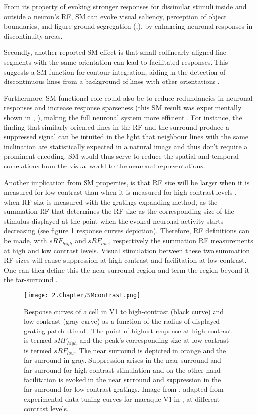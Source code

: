 From its property of evoking stronger responses for dissimilar stimuli inside and outside a neuron's RF, SM can evoke visual saliency, perception of object boundaries, and figure-ground segregation (\cite{Nothdurft2000},\cite{Lamme1995}), by enhancing neuronal responses in discontinuity areas.

Secondly, another reported SM effect is that small collinearly aligned line segments with the same orientation can lead to facilitated responses. This suggests a SM function for contour integration, aiding in the detection of discontinuous lines from a background of lines with other orientations \cite{Kapadia1995}.

Furthermore, SM functional role could also be to reduce redundancies in neuronal responses and increase response sparseness (this SM result was experimentally shown in \cite{Vinje2000}, \cite{Wolf2014}), making the full neuronal system more efficient \cite{Barlow1961}. For instance, the finding that similarly oriented lines in the RF and the surround produce a suppressed signal can be intuited in the light that neighbour lines with the same inclination are statistically expected in a natural image and thus don't require a prominent encoding. SM would thus serve to reduce the spatial and temporal correlations from the visual world to the neuronal representations.

Another implication from SM properties, is that RF size will be larger when it is measured for low contrast than when it is measured for high contrast levels  \cite{Sceniak1999}, when RF size is measured with the gratings expanding method, as the summation RF that determines the RF size as the corresponding size of the stimulus displayed at the point when the evoked neuronal activity starts decreasing (see figure \ref{SMcontrast} response curves depiction). Therefore, RF definitions can be made, with $sRF_{high}$ and $sRF_{low}$, respectively the summation RF measurements at high and low contrast levels. Visual stimulation between these two summation RF sizes will cause suppression at high contrast and facilitation at low contrast. One can then define this the near-surround region and term the region beyond it the far-surround \cite{Angelucci2017}.

\begin{figure}[H]
\center
\texttt{[image: 2.Chapter/SMcontrast.png]}
\caption{Response curves of a cell in V1 to high-contrast (black curve) and low-contrast (gray curve) as a function of the radius of displayed grating patch stimuli. The point of highest response at high-contrast is termed $sRF_{high}$ and the peak's corresponding size at low-contrast is termed $sRF_{low}$. The near surround is depicted in orange and the far surround in gray. Suppression arises in the near-surround and far-surround for high-contrast stimulation and on the other hand facilitation is evoked in the near surround and suppression in the far-surround for low-contrast gratings.
\newline \newline \tiny{Image from \cite{Angelucci2017}, adapted from experimental data tuning curves for macaque V1 in \cite{Shushruth2009}, at different contrast levels.}}
\label{SMcontrast}
\end{figure}


